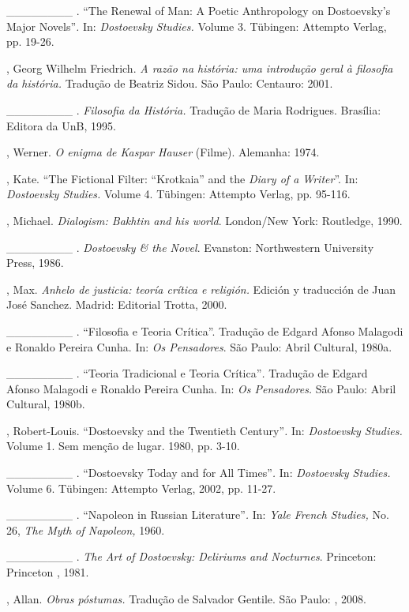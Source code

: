 \begin{Parskip}
\_\_\_\_\_\_\_\_ . ``The Renewal of Man: A Poetic Anthropology on
Dostoevsky's Major Novels''\emph{.} In: \emph{Dostoevsky Studies.}
Volume 3. Tübingen: Attempto Verlag, pp. 19-26.

, Georg Wilhelm Friedrich. \emph{A razão na história: uma
introdução geral à filosofia da história.} Tradução de Beatriz Sidou.
São Paulo: Centauro: 2001.

\_\_\_\_\_\_\_\_ . \emph{Filosofia da História.} Tradução de Maria
Rodrigues. Brasília: Editora da UnB, 1995.

, Werner. \emph{O enigma de Kaspar Hauser} (Filme). Alemanha:
1974.

, Kate. ``The Fictional Filter: ``Krotkaia'' and the \emph{Diary
of a Writer}''. In: \emph{Dostoevsky Studies.} Volume 4. Tübingen:
Attempto Verlag, pp. 95-116.

, Michael. \emph{Dialogism: Bakhtin and his world}. London/New
York: Routledge, 1990.

\_\_\_\_\_\_\_\_ . \emph{Dostoevsky \& the Novel}. Evanston:
Northwestern University Press, 1986.

, Max. \emph{Anhelo de justicia: teoría crítica e religión.}
Edición y traducción de Juan José Sanchez. Madrid: Editorial Trotta,
2000.

\_\_\_\_\_\_\_\_ . ``Filosofia e Teoria Crítica''. Tradução de Edgard
Afonso Malagodi e Ronaldo Pereira Cunha. In: \emph{Os Pensadores}. São
Paulo: Abril Cultural, 1980a.

\_\_\_\_\_\_\_\_ . ``Teoria Tradicional e Teoria Crítica''\emph{.}
Tradução de Edgard Afonso Malagodi e Ronaldo Pereira Cunha. In: \emph{Os
Pensadores.} São Paulo: Abril Cultural, 1980b.

, Robert-Louis. ``Dostoevsky and the Twentieth Century''\emph{.}
In: \emph{Dostoevsky Studies.} Volume 1. Sem menção de lugar. 1980, pp.
3-10.

\_\_\_\_\_\_\_\_ . ``Dostoevsky Today and for All Times''\emph{.} In:
\emph{Dostoevsky Studies.} Volume 6. Tübingen: Attempto Verlag, 2002,
pp. 11-27.

\_\_\_\_\_\_\_\_ . ``Napoleon in Russian Literature''\emph{.} In:
\emph{Yale French Studies,} No. 26, \emph{The Myth of Napoleon,} 1960.

\_\_\_\_\_\_\_\_ . \emph{The Art of Dostoevsky: Deliriums and
Nocturnes}. Princeton: Princeton , 1981.

, Allan. \emph{Obras póstumas.} Tradução de Salvador Gentile. São
Paulo: , 2008.


\end{Parskip}
